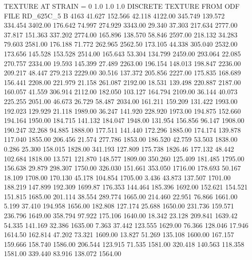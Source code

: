 TEXTURE AT STRAIN = 0
1.0   1.0   1.0
DISCRETE TEXTURE FROM ODF FILE RD_625C_5
B 4163
  41.627  152.566   42.118      4122.00
 345.749  139.572  334.454      3402.00
 176.642   74.997  274.929      3343.00
  29.340   37.303  217.634      2777.00
  37.817  151.363  337.202      2774.00
 165.896  138.570   58.846      2597.00
 218.132   34.283   79.603      2581.00
 176.188   71.772  262.965      2562.50
 173.105   44.338  305.040      2532.00
 173.656  145.528  153.528      2514.00
 165.643   53.304  134.799      2459.00
 293.064   22.085  270.757      2334.00
  19.593  145.399   27.489      2263.00
 196.154  148.013  198.847      2236.00
 209.217   48.447  279.213      2229.00
  30.516  137.372  205.856      2227.00
 175.835  168.689  156.441      2208.00
 221.979   21.158  261.087      2192.00
  18.531  139.498  220.887      2187.00
 160.057   41.559  306.914      2112.00
 182.050  103.127  164.794      2109.00
  36.144   40.073  225.255      2051.00
  46.673   26.729   58.487      2034.00
 161.211  159.209  131.422      1993.00
 192.023  129.929   21.118      1989.00
  36.247  141.920  228.920      1973.00
 194.875  152.660  194.164      1950.00
 184.715  141.132  184.047      1948.00
 131.954  156.856   96.147      1908.00
 190.247   32.268   94.885      1888.00
 177.511  141.440  172.296      1885.00
 174.174  139.878  117.040      1855.00
 206.456   21.574  277.786      1853.00
 186.520   42.759   53.503      1838.00
   0.286   25.300  158.015      1828.00
 341.193  127.809  175.738      1826.46
 177.132   48.442  102.684      1818.00
  13.571  121.870  148.577      1809.00
 350.260  125.409  181.485      1795.00
 156.638   29.879  298.307      1750.00
 326.030  151.661  353.050      1716.00
 178.693   50.167   18.109      1708.00
 170.130   45.178  104.854      1705.00
   3.436   43.873  137.507      1701.00
 188.219  147.899  192.309      1699.87
 176.353  144.464  185.396      1692.00
 152.621  154.521  151.815      1685.00
 201.114   38.554  289.774      1665.00
 214.460   22.951   76.866      1661.00
   5.199   37.410  194.958      1656.00
 182.808  127.174   25.688      1650.00
 231.736  159.571  236.796      1649.00
 358.794   97.922  175.106      1640.00
  18.342   23.128  209.841      1639.42
  54.335  141.169   32.386      1635.00
   7.363   37.442  123.555      1629.00
  76.366  128.046   17.946      1614.50
 162.814   47.202   73.321      1609.00
  13.827   51.269  135.108      1600.00
 167.157  159.666  158.740      1586.00
 206.544  123.915   71.535      1581.00
 320.418  140.563  118.358      1581.00
 339.440   83.916  138.072      1564.00
